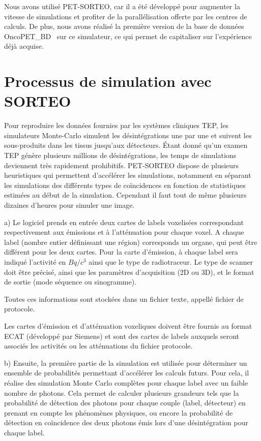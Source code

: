 Nous avons utilisé PET-SORTEO, car il a été développé pour augmenter la vitesse de simulations et profiter de la parallélisation offerte par les centres de calculs. De plus, nous avons réalisé la première version de la base de données OncoPET\_BD~\cite{tomei2010oncopet_db} sur ce simulateur, ce qui permet de capitaliser sur l’expérience déjà acquise. 

	\section{Processus de simulation avec SORTEO}

Pour reproduire les données fournies par les systèmes cliniques TEP, les simulateurs Monte-Carlo simulent les désintégrations une par une et suivent les sous-produits dans les tissus jusqu'aux détecteurs. Étant donné qu'un examen TEP génère plusieurs millions de désintégrations, les temps de simulations deviennent très rapidement prohibitifs. PET-SORTEO dispose de plusieurs heuristiques qui permettent d'accélérer les simulations, notamment en séparant les simulations des différents types de coïncidences en fonction de statistiques estimées au début de la simulation. Cependant il faut tout de même plusieurs dizaines d'heures pour simuler une image.

a) Le logiciel prends en entrée deux cartes de labels voxelisées correspondant respectivement aux émissions et à l'atténuation pour chaque voxel. A chaque label (nombre entier définissant une région) corresponds un organe, qui peut être différent pour les deux cartes. Pour la carte d'émission, à chaque label sera indiqué l'activité en $Bq/c^3$ ainsi que le type de radiotraceur. Le type de scanner doit être précisé, ainsi que les paramètres d'acquisition (2D ou 3D), et le format de sortie (mode séquence ou sinogramme).

Toutes ces informations sont stockées dans un fichier texte, appellé fichier de protocole.

Les cartes d'émission et d'atténuation voxeliques doivent être fournis au format ECAT (développé par Siemens) et sont des cartes de labels auxquels seront associés les activités ou les atténuations du fichier protocole.

b) Ensuite, la première partie de la simulation est utilisée pour déterminer un ensemble de probabilités permettant d'accélérer les calculs futurs. Pour cela, il réalise des simulation Monte Carlo complètes pour chaque label avec un faible nombre de photons. Cela permet de calculer plusieurs grandeurs tels que la probabilité de détection des photons pour chaque couple (label, détecteur) en prenant en compte les phénomènes physiques, ou encore la probabilité de détection en coïncidence des deux photons émis lors d'une désintégration pour chaque label.


